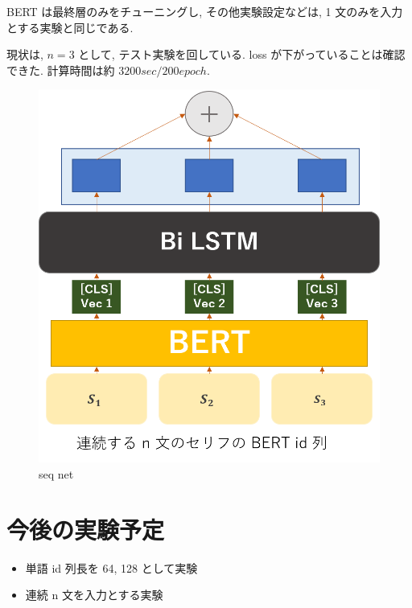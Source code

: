 \documentclass[twocolumn]{jarticle}     %
\begin{document}
BERT は最終層のみをチューニングし, その他実験設定などは, 1 文のみを入力とする実験と同じである.

現状は, $n = 3$ として, テスト実験を回している. loss が下がっていることは確認できた.
計算時間は約 $3200 sec / 200 epoch$.

\begin{figure}[!hb]
  \begin{center}
    \includegraphics[scale=0.5]{net.png}
    \caption{seq net} %
    \label{fig:net} %
  \end{center}
\end{figure}

\newpage

\section{今後の実験予定}
\begin{itemize}
  \item 単語 id 列長を 64, 128 として実験
  \item 連続 n 文を入力とする実験
\end{itemize}



\end{document}
